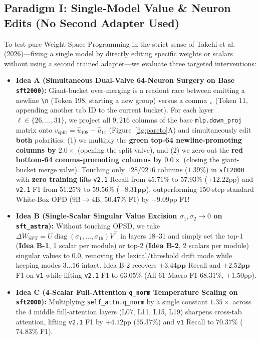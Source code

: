 \documentclass[11pt,a4paper]{article}
\begin{document}
\subsection{Paradigm I: Single-Model Value \& Neuron Edits (No Second Adapter Used)}
To test pure Weight-Space Programming in the strict sense of Takehi et al. (2026)—fixing a single model by directly editing specific weights or scalars without using a second trained adapter—we evaluate three targeted interventions:
\begin{itemize}
    \item \textbf{Idea A (Simultaneous Dual-Valve 64-Neuron Surgery on Base \texttt{sft2000}):} Giant-bucket over-merging is a readout race between emitting a newline \texttt{\textbackslash n} (Token 198, starting a new group) versus a comma \texttt{,} (Token 11, appending another tab ID to the current bucket). For each layer $\ell \in \{26,\dots,31\}$, we project all $9,216$ columns of the base \texttt{mlp.down\_proj} matrix onto $v_{\text{split}} = \hat{u}_{198} - \hat{u}_{11}$ (Figure~\ref{fig:pareto}A) and simultaneously edit \textbf{both} polarities: (1) we multiply the \textbf{green top-64 newline-promoting columns by $2.0\times$} (opening the split valve), and (2) we zero out the \textbf{red bottom-64 comma-promoting columns by $0.0\times$} (closing the giant-bucket merge valve). Touching only $128/9216$ columns ($1.39\%$) in \texttt{sft2000} with \textbf{zero training} lifts \texttt{v2.1} Recall from $45.71\%$ to $\mathbf{57.93\%}$ ($+12.22\text{pp}$) and \texttt{v2.1} F1 from $51.25\%$ to $\mathbf{59.56\%}$ ($\mathbf{+8.31\text{pp}}$), outperforming 150-step standard White-Box OPD ($9\text{B}\to 4\text{B}$, $50.47\%$ F1) by $+9.09\text{pp}$ F1!
    \item \textbf{Idea B (Single-Scalar Singular Value Excision $\sigma_1, \sigma_2 \to 0$ on \texttt{sft\_astra}):} Without touching OPSD, we take $\Delta W_{\text{SFT}} = U \operatorname{diag}(\sigma_1,\dots,\sigma_{16}) V^\top$ in layers 18--31 and simply set the top-1 (\textbf{Idea B-1}, 1 scalar per module) or top-2 (\textbf{Idea B-2}, 2 scalars per module) singular values to $0.0$, removing the lexical/threshold drift mode while keeping modes $3\dots 16$ intact. Idea B-2 recovers $\mathbf{+3.44\text{pp}}$ Recall and $\mathbf{+2.52\text{pp}}$ F1 on \texttt{v1} while lifting \texttt{v2.1} F1 to $63.05\%$ (All-61 Macro F1 $68.31\%$, $+1.50\text{pp}$).
    \item \textbf{Idea C (4-Scalar Full-Attention \texttt{q\_norm} Temperature Scaling on \texttt{sft2000}):} Multiplying \texttt{self\_attn.q\_norm} by a single constant $1.35\times$ across the 4 middle full-attention layers (L07, L11, L15, L19) sharpens cross-tab attention, lifting \texttt{v2.1} F1 by $+4.12\text{pp}$ ($55.37\%$) and \texttt{v1} Recall to $\mathbf{70.37\%}$ ($74.83\%$ F1).
\end{itemize}
\end{document}
